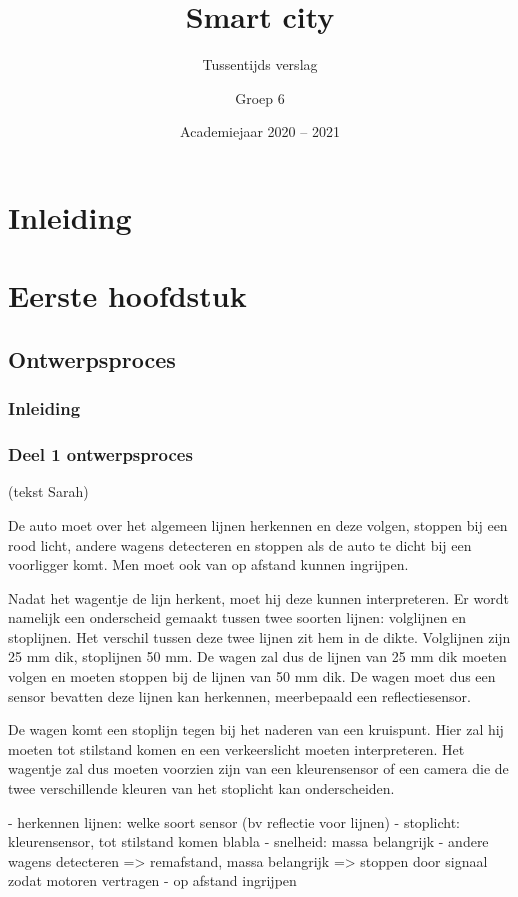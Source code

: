 \documentclass[a4paper,twoside,kulak]{kulakreport} %
\title{Smart city}
\subtitle{Tussentijds verslag}
\author{Groep 6}
\institute{KU Leuven Kulak, Wetenschap \& Technologie}
\date{Academiejaar 2020 -- 2021}
\begin{document}

\titlepage

\tableofcontents

\chapter*{Inleiding}

\chapter{Eerste hoofdstuk}
\section{Ontwerpsproces}
\subsection*{Inleiding}

\subsection{Deel 1 ontwerpsproces}

(tekst Sarah)

De auto moet over het algemeen lijnen herkennen en deze volgen, stoppen bij een rood licht, andere wagens detecteren en stoppen als de auto te dicht bij een voorligger komt. Men moet ook van op afstand kunnen ingrijpen.

Nadat het wagentje de lijn herkent, moet hij deze kunnen interpreteren. Er wordt namelijk een onderscheid gemaakt tussen twee soorten lijnen: volglijnen en stoplijnen. Het verschil tussen deze twee lijnen zit hem in de dikte. Volglijnen zijn 25 mm dik, stoplijnen 50 mm. De wagen zal dus de lijnen van 25 mm dik moeten volgen en moeten stoppen bij de lijnen van 50 mm dik. De wagen moet dus een sensor bevatten deze lijnen kan herkennen, meerbepaald een reflectiesensor. 

De wagen komt een stoplijn tegen bij het naderen van een kruispunt. Hier zal hij moeten tot stilstand komen en een verkeerslicht moeten interpreteren. Het wagentje zal dus moeten voorzien zijn van een kleurensensor of een camera die de twee verschillende kleuren van het stoplicht kan onderscheiden. 

- herkennen lijnen: welke soort sensor (bv reflectie voor lijnen)
- stoplicht: kleurensensor, tot stilstand komen blabla
- snelheid: massa belangrijk
- andere wagens detecteren => remafstand, massa belangrijk => stoppen door signaal zodat motoren vertragen
- op afstand ingrijpen
\end{document}
